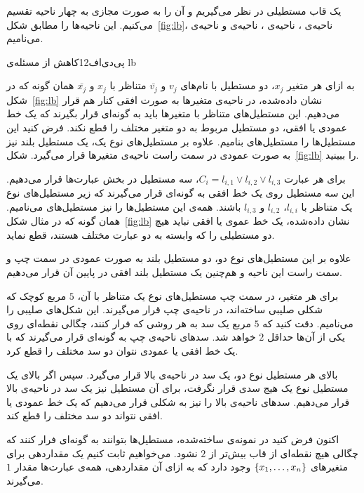 یک قاب مستطیلی در نظر می‌گیریم و آن را به صورت مجازی به چهار ناحیه تقسیم می‌کنیم. این ناحیه‌ها را مطابق شکل~\ref{fig:lb}، ناحیه‌ی ، ناحیه‌ی ، ناحیه‌ی  و ناحیه‌ی  می‌نامیم.

‌پی‌دی‌اف{12}{کاهش از مسئله‌ی }{lb}


 به ازای هر متغیر $x_{j}$، دو مستطیل با نام‌های $v_{j}$ و $\bar{v_{j}}$ متناظر با $x_{j}$ و $\bar{x_{j}}$ همان گونه که در شکل~\ref{fig:lb} نشان داده‌شده، در ناحیه‌ی متغیر‌ها به صورت افقی کنار هم قرار می‌دهیم. این مستطیل‌های متناظر با متغیرها باید به گونه‌ای قرار بگیرند که یک خط عمودی یا افقی، دو مستطیل مربوط به دو متغیر مختلف را قطع نکند. فرض کنید این مستطیل‌ها را مستطیل‌های  بنامیم. علاوه بر مستطیل‌های نوع یک، یک مستطیل بلند نیز به صورت عمودی در سمت راست ناحیه‌ی متغیر‌ها قرار می‌گیرد. شکل~\ref{fig:lb}  را ببینید.

 برای هر عبارت $C_i = l_{i, 1} \vee l_{i, 2} \vee l_{i, 3}$، سه مستطیل در بخش عبارت‌ها قرار می‌دهیم. این سه مستطیل روی یک خط افقی به گونه‌ای قرار می‌گیرند که زیر مستطیل‌های نوع یک متناظر با $l_{i, i}$، $l_{i, 2}$ و $l_{i, 3}$ باشند. همه‌ی این مستطیل‌ها را نیز مستطیل‌های  می‌نامیم. همان گونه که در مثال شکل~\ref{fig:lb}  نشان داده‌شده، یک خط عموی یا افقی نباید هیچ دو مستطیلی را که وابسته به دو عبارت مختلف هستند، قطع نماید.

علاوه بر این مستطیل‌های نوع دو، دو مستطیل بلند به صورت عمودی در سمت چپ و سمت راست این ناحیه و هم‌چنین یک مستطیل بلند افقی در پایین آن قرار می‌دهیم.

 برای هر متغیر، در سمت چپ مستطیل‌های نوع یک متناظر با آن، $5$ مربع کوچک که شکلی صلیبی ساخته‌اند، در ناحیه‌ی چپ قرار می‌گیرند. این شکل‌های صلیبی را  می‌نامیم. دقت کنید که $5$ مربع یک سد به هر روشی که فرار کنند، چگالی نقطه‌ای روی یکی از آن‌ها حد‌اقل $2$ خواهد شد. سد‌های ناحیه‌ی چپ به گونه‌ای قرار می‌گیرند که با یک خط افقی یا عمودی نتوان دو سد مختلف را قطع کرد.

 بالای هر مستطیل نوع دو، یک سد در ناحیه‌ی بالا قرار می‌گیرد. سپس اگر بالای یک مستطیل نوع یک هیج سدی قرار نگرفت، برای آن مستطیل نیز یک سد در ناحیه‌ی بالا قرار می‌دهیم. سد‌های ناحیه‌ی بالا را نیز به شکلی قرار می‌دهیم که یک خط عمودی یا افقی نتواند دو سد مختلف را قطع کند.


اکنون فرض کنید در نمونه‌ی ساخته‌شده، مستطیل‌ها بتوانند به گونه‌ای فرار کنند که چگالی هیچ نقطه‌ای از قاب بیش‌تر از $2$ نشود. می‌خواهیم ثابت کنیم یک مقداردهی برای متغیر‌های ${\{ x_{1}, \ldots, x_{n} \}}$ وجود دارد که به ازای آن مقداردهی، همه‌ی عبارت‌ها مقدار $1$ می‌گیرند.

